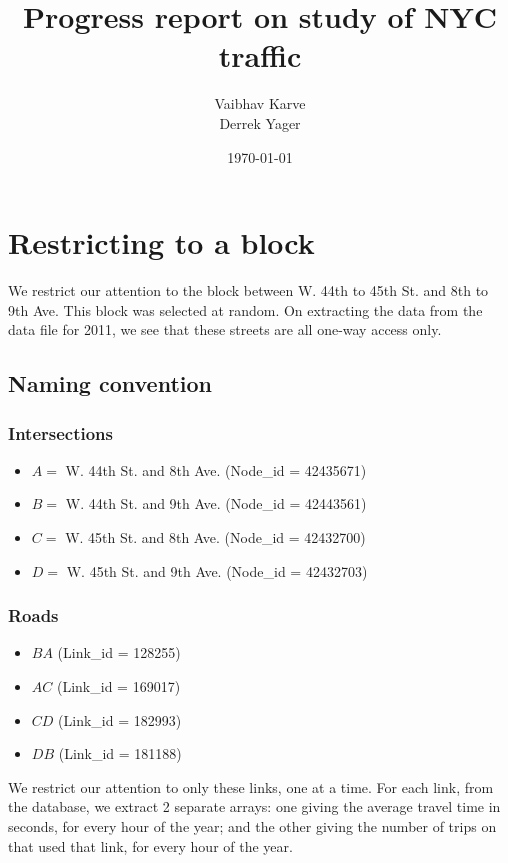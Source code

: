 \documentclass[10pt,a4paper]{amsart}
\author{Vaibhav Karve\\Derrek Yager}
\title{Progress report on study of NYC traffic}
\begin{document}
\date{\today}
\maketitle

\section{Restricting to a block}
We restrict our attention to the block between W. 44th to 45th St. and
8th to 9th Ave. This block was selected at random. On extracting the
data from the data file for 2011, we see that these streets are all one-way
access only.

\subsection{Naming convention}
\subsubsection{Intersections}
	\begin{itemize}
		\item \(A=\) W. 44th St. and 8th Ave. (Node\_id = 42435671)
		\item \(B=\) W. 44th St. and 9th Ave. (Node\_id = 42443561)
		\item \(C=\) W. 45th St. and 8th Ave. (Node\_id = 42432700)
		\item \(D=\) W. 45th St. and 9th Ave. (Node\_id = 42432703)
	\end{itemize}

\subsubsection{Roads}
	\begin{itemize}
		\item \(BA\) (Link\_id = 128255)
		\item \(AC\) (Link\_id = 169017)
		\item \(CD\) (Link\_id = 182993)
		\item \(DB\) (Link\_id = 181188)
	\end{itemize}
		
We restrict our attention to only these links, one at a time. For each
link, from the database, we extract 2 separate arrays: one giving the
average travel time in seconds, for every hour of the year; and the other
giving the number of trips on that used that link, for every hour of the
year.
\end{document}
